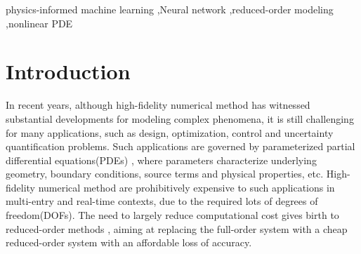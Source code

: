 \documentclass[preprint, 10pt]{elsarticle}
\begin{document}
\begin{frontmatter}
\begin{abstract}
\end{abstract}

\begin{keyword}
   physics-informed machine learning \sep Neural network  \sep reduced-order modeling \sep nonlinear PDE



\end{keyword}

\end{frontmatter}


\section{Introduction}
In recent years, although high-fidelity numerical method has witnessed substantial developments for modeling complex phenomena, it is still challenging for many applications, such as design, optimization, control and uncertainty quantification problems. Such applications are governed by parameterized partial differential equations(PDEs) \cite{hesthaven2016certified, quarteroni2015reduced}, where parameters characterize underlying geometry, boundary conditions, source terms and physical properties, etc. High-fidelity numerical method are prohibitively expensive to such applications in multi-entry and real-time contexts, due to the required lots of degrees of freedom(DOFs).
The need to largely reduce computational cost gives birth to reduced-order methods \cite{lucia2004reduced}, aiming at replacing the full-order system with a cheap reduced-order system with an affordable loss of accuracy.
\end{document}
